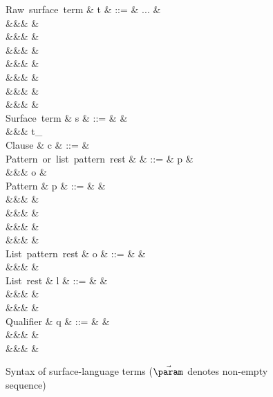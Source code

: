 \begin{figure}[H]
\begin{syntaxfig}
\mbox{Raw surface term}
&
t
&
::=
&
...
&
\\
&&&
&
\\
&&&
&
\\
&&&
&
\\
&&&
&
\\
&&&
&
\\
&&&
&
\\
&&&
&
\\[2mm]

\mbox{Surface term}
&
s
&
::=
&
\hole
&
\\
&&&
t_{\alpha}
\\[2mm]

\mbox{Clause}
&
c
&
::=
&
\\[2mm]

\mbox{Pattern or list pattern rest}
&
\pi
&
::=
&
p
&
\\
&&&
o
&
\\[2mm]

\mbox{Pattern}
&
p
&
::=
&
&
\\
&&&
\pattNil
&
\\
&&&
&
\\
&&&
&
\\
&&&
&
\\[2mm]

\mbox{List pattern rest}
&
o
&
::=
&
\pattSNil
&
\\
&&&
&
\\[2mm]

\mbox{List rest}
&
l
&
::=
&
\hole
&
\\
&&&
\annot{\sExNil}{\alpha}
&
\\
&&&
&
\\[2mm]

\mbox{Qualifier}
&
q
&
::=
&
&
\\
&&&
&
\\
&&&
&
\\[2mm]

\end{syntaxfig}
\caption{Syntax of surface-language terms ($\vec{\param}$ denotes non-empty sequence)}
\end{figure}
